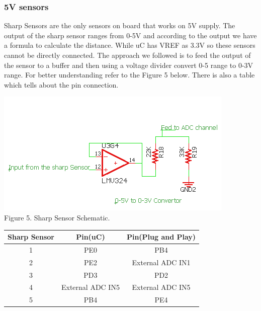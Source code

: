 \documentclass[a4paper,10pt,oneside]{article}
\begin{document}
{		\subsubsection{\textbf{5V sensors}}
		{Sharp Sensors are the only sensors on board that works on 5V supply. The output of the sharp sensor ranges from 0-5V and according to the output we have a formula to calculate the distance. While uC has VREF as 3.3V so these sensors cannot be directly connected. The approach we followed is to feed the output of the sensor to a buffer and then using a voltage divider convert 0-5 range to 0-3V range. For better understanding refer to the Figure 5 below. There is also a table which tells about the pin connection.}
		\begin{center}
			\includegraphics{Images/5Vsensor1}\\
			Figure 5. Sharp Sensor Schematic.\\
			\begin{tabular}{|c|c|c|}
				\hline
				Sharp Sensor & Pin(uC)&Pin(Plug and Play)\\
				\hline
				1&PE0&PB4\\
				\hline
				2&PE2&External ADC IN1\\
				\hline
				3&PD3&PD2\\
				\hline
				4&External ADC IN5&External ADC IN5\\
				\hline
				5&PB4&PE4\\
				\hline
			\end{tabular}
		\end{center}
}
\end{document}
